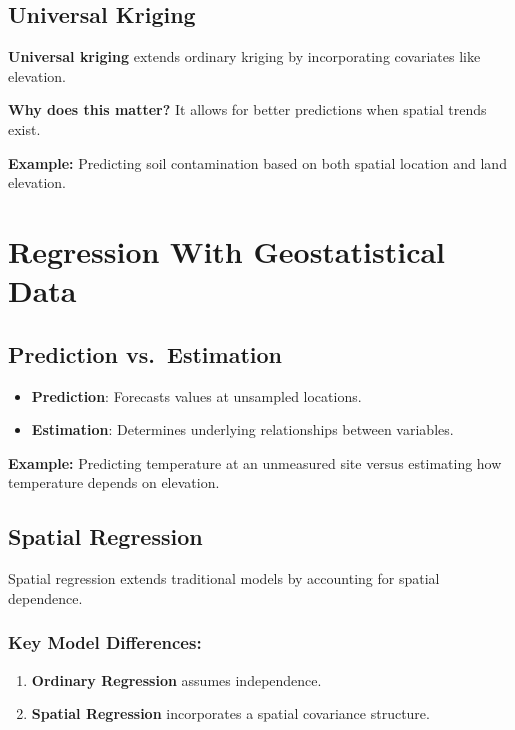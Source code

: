 \documentclass[
  11pt,
]{report}
\providecommand{\tightlist}{%
  \setlength{\itemsep}{0pt}\setlength{\parskip}{0pt}}\usepackage{longtable,booktabs,array}
\begin{document}
\section{Universal Kriging}\label{universal-kriging}

\textbf{Universal kriging} extends ordinary kriging by incorporating
covariates like elevation.

\textbf{Why does this matter?} It allows for better predictions when
spatial trends exist.

\textbf{Example:} Predicting soil contamination based on both spatial
location and land elevation.

\chapter{Regression With Geostatistical
Data}\label{regression-with-geostatistical-data}

\section{Prediction vs.~Estimation}\label{prediction-vs.-estimation}

\begin{itemize}
\tightlist
\item
  \textbf{Prediction}: Forecasts values at unsampled locations.
\item
  \textbf{Estimation}: Determines underlying relationships between
  variables.
\end{itemize}

\textbf{Example:} Predicting temperature at an unmeasured site versus
estimating how temperature depends on elevation.

\section{Spatial Regression}\label{spatial-regression}

Spatial regression extends traditional models by accounting for spatial
dependence.

\subsection{Key Model Differences:}\label{key-model-differences}

\begin{enumerate}
\def\labelenumi{\arabic{enumi}.}
\tightlist
\item
  \textbf{Ordinary Regression} assumes independence.
\item
  \textbf{Spatial Regression} incorporates a spatial covariance
  structure.
\end{enumerate}
\end{document}
